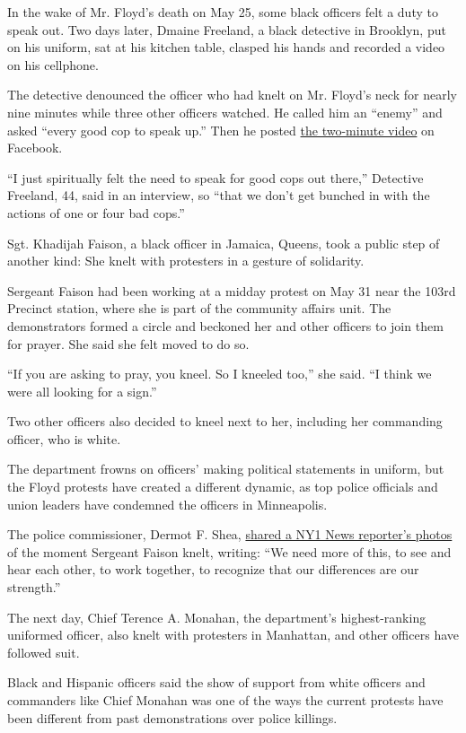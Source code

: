 In the wake of Mr. Floyd's death on May 25, some black officers felt a
duty to speak out. Two days later, Dmaine Freeland, a black detective in
Brooklyn, put on his uniform, sat at his kitchen table, clasped his
hands and recorded a video on his cellphone.

The detective denounced the officer who had knelt on Mr. Floyd's neck
for nearly nine minutes while three other officers watched. He called
him an ``enemy'' and asked ``every good cop to speak up.'' Then he
posted
\href{https://www.facebookcorewwwi.onion/dromarr.freeland/videos/10216336652991409}{the
two-minute video} on Facebook.

``I just spiritually felt the need to speak for good cops out there,''
Detective Freeland, 44, said in an interview, so ``that we don't get
bunched in with the actions of one or four bad cops.''

Sgt. Khadijah Faison, a black officer in Jamaica, Queens, took a public
step of another kind: She knelt with protesters in a gesture of
solidarity.

Sergeant Faison had been working at a midday protest on May 31 near the
103rd Precinct station, where she is part of the community affairs unit.
The demonstrators formed a circle and beckoned her and other officers to
join them for prayer. She said she felt moved to do so.

``If you are asking to pray, you kneel. So I kneeled too,'' she said.
``I think we were all looking for a sign.''

Two other officers also decided to kneel next to her, including her
commanding officer, who is white.

The department frowns on officers' making political statements in
uniform, but the Floyd protests have created a different dynamic, as top
police officials and union leaders have condemned the officers in
Minneapolis.

The police commissioner, Dermot F. Shea,
\href{https://twitter.com/NYPDShea/status/1267177766769889282}{shared a
NY1 News reporter's photos} of the moment Sergeant Faison knelt,
writing: ``We need more of this, to see and hear each other, to work
together, to recognize that our differences are our strength.''

The next day, Chief Terence A. Monahan, the department's highest-ranking
uniformed officer, also knelt with protesters in Manhattan, and other
officers have followed suit.

Black and Hispanic officers said the show of support from white officers
and commanders like Chief Monahan was one of the ways the current
protests have been different from past demonstrations over police
killings.


